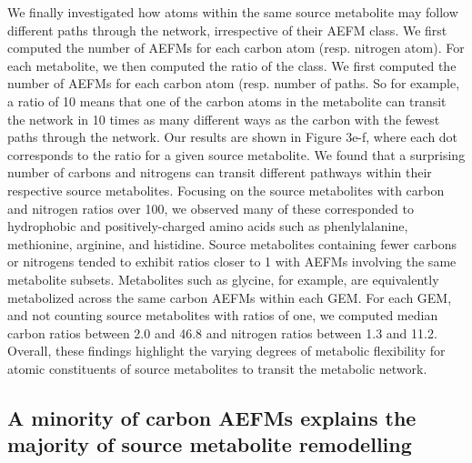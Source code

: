 \documentclass[12pt]{article}
\begin{document}
We finally investigated how atoms within the same source metabolite may
follow different paths through the network, irrespective of their AEFM
class. We first computed the number of AEFMs for each carbon atom (resp.
nitrogen atom). For each metabolite, we then computed the ratio of the
class. We first computed the number of AEFMs for each carbon atom (resp.
number of paths. So for example, a ratio of 10 means that one of the
carbon atoms in the metabolite can transit the network in 10 times as many
different ways as the carbon with the fewest paths through the network.
Our results are shown in Figure 3e-f, where each dot corresponds to the
ratio for a given source metabolite. We found that a surprising number of
carbons and nitrogens can transit different pathways within their
respective source metabolites. Focusing on the source metabolites with
carbon and nitrogen ratios over 100, we observed many of these
corresponded to hydrophobic and positively-charged amino acids such as
phenlylalanine, methionine, arginine, and histidine. Source metabolites
containing fewer carbons or nitrogens tended to exhibit ratios closer to
1 with AEFMs involving the same metabolite subsets. Metabolites such as
  glycine, for example, are equivalently metabolized across the same
  carbon AEFMs within each GEM. For each GEM, and not counting source
  metabolites with ratios of one, we computed median carbon ratios between
  2.0 and 46.8 and nitrogen ratios between 1.3 and 11.2. Overall, these
  findings highlight the varying degrees of metabolic flexibility for
  atomic constituents of source metabolites to transit the metabolic
  network.

\subsection*{A minority of carbon AEFMs explains the majority of source metabolite remodelling}

\end{document}
